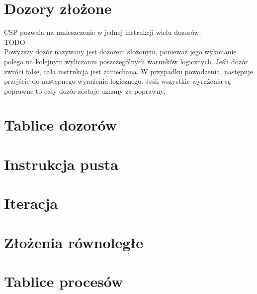 \documentclass[a4paper]{report}
\begin{document}
  \section{Dozory złożone}
  CSP pozwala na umieszczenie w jednej instrukcji wielu dozorów.\\
  TODO\\
  Powyższy dozór nazywany jest dozorem słożonym, ponieważ jego wykonanie polega na kolejnym wyliczaniu poszczególnych warunków logicznych.
  Jeśli dozór zwróci false, cała instrukcja jest zaniechana.
  W przypadku powodzenia, następuje przejście do następnego wyrażenia logicznego.
  Jeśli wszystkie wyrażenia są poprawne to cały dozór zostaje uznany za poprawny.

  \section{Tablice dozorów}

  \section{Instrukcja pusta}

  \section{Iteracja}

  \section{Złożenia równoległe}

  \section{Tablice procesów}
\end{document}

